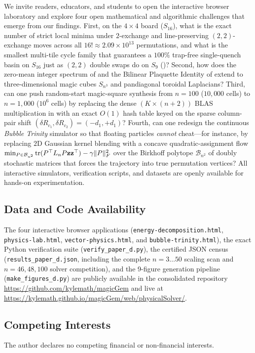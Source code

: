 We invite readers, educators, and students to open the interactive browser laboratory and explore four open mathematical and algorithmic challenges that emerge from our findings. First, on the $4\times 4$ board ($S_{16}$), what is the exact number of strict local minima under $2$-exchange and line-preserving $(2,2)$-exchange moves across all $16! \approx 2.09\times 10^{13}$ permutations, and what is the smallest multi-tile cycle family that guarantees a $100\%$ trap-free single-quench basin on $S_{16}$ just as $(2,2)$ double swaps do on $S_9$ ()? Second, how does the zero-mean integer spectrum of  and the Bilinear Plaquette Identity of  extend to three-dimensional magic cubes $S_{n^3}$ \cite{rogers2004inertia,rogers2005multipole} and pandiagonal toroidal Laplacians? Third, can one push random-start magic-square synthesis from $n = 100$ ($10{,}000$ cells) to $n = 1{,}000$ ($10^6$ cells) by replacing the dense $(K \times (n+2))$ BLAS multiplication in  with an exact $O(1)$ hash table keyed on the sparse column-pair shift $(\delta R_{c_1}, \delta R_{c_2}) = (-d_1, +d_1)$? Fourth, can one redesign the continuous \emph{Bubble Trinity} simulator so that floating particles \emph{cannot} cheat---for instance, by replacing $2\mathrm{D}$ Gaussian kernel blending with a concave quadratic-assignment flow $\min_{P \in \mathcal{B}_{n^2}} \operatorname{tr}(P^\top L_n P \mathbf{z}\mathbf{z}^\top) - \gamma \|P\|_F^2$ over the Birkhoff polytope $\mathcal{B}_{n^2}$ of doubly stochastic matrices that forces the trajectory into true permutation vertices? All interactive simulators, verification scripts, and datasets are openly available for hands-on experimentation.

\subsection*{Data and Code Availability}

The four interactive browser applications (\texttt{energy-decomposition.html}, \texttt{physics-lab.html}, \texttt{vector-physics.html}, and \texttt{bubble-trinity.html}), the exact Python verification suite (\texttt{verify\_paper\_d.py}), the certified JSON census (\texttt{results\_paper\_d.json}, including the complete $n=3\dots 50$ scaling scan and $n=46, 48, 100$ solver competition), and the 9-figure generation pipeline (\texttt{make\_figures\_d.py}) are publicly available in the consolidated repository \url{https://github.com/kylemath/magicGem} and live at \url{https://kylemath.github.io/magicGem/web/physicalSolver/}.

\subsection*{Competing Interests}

The author declares no competing financial or non-financial interests.

